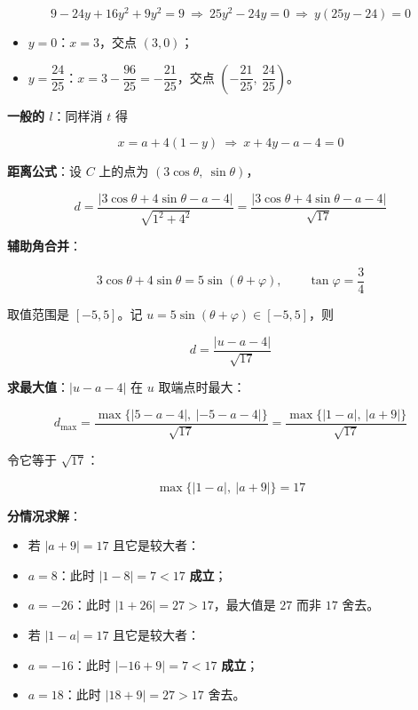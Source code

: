 \[9-24y+16y^{2}+9y^{2}=9\ \Longrightarrow\ 25y^{2}-24y=0\ \Longrightarrow\ y(25y-24)=0\]

\begin{itemize}
\item $y=0$：$x=3$，交点 $(3,0)$；
\item $y=\dfrac{24}{25}$：$x=3-\dfrac{96}{25}=-\dfrac{21}{25}$，交点 $\left(-\dfrac{21}{25},\ \dfrac{24}{25}\right)$。
\end{itemize}



\textbf{一般的 $l$}：同样消 $t$ 得

\[x=a+4(1-y)\ \Longrightarrow\ x+4y-a-4=0\]

\textbf{距离公式}：设 $C$ 上的点为 $(3\cos\theta,\ \sin\theta)$，

\[d=\frac{|3\cos\theta+4\sin\theta-a-4|}{\sqrt{1^{2}+4^{2}}}=\frac{|3\cos\theta+4\sin\theta-a-4|}{\sqrt{17}}\]

\textbf{辅助角合并}：

\[3\cos\theta+4\sin\theta=5\sin(\theta+\varphi),\qquad \tan\varphi=\frac34\]

取值范围是 $[-5,5]$。记 $u=5\sin(\theta+\varphi)\in[-5,5]$，则

\[d=\frac{|u-a-4|}{\sqrt{17}}\]

\textbf{求最大值}：$|u-a-4|$ 在 $u$ 取端点时最大：

\[d_{\max}=\frac{\max\{|5-a-4|,\ |-5-a-4|\}}{\sqrt{17}}=\frac{\max\{|1-a|,\ |a+9|\}}{\sqrt{17}}\]

令它等于 $\sqrt{17}$：

\[\max\{|1-a|,\ |a+9|\}=17\]

\textbf{分情况求解}：

\begin{itemize}
\item 若 $|a+9|=17$ 且它是较大者：
\item $a=8$：此时 $|1-8|=7<17$  \textbf{成立}；
\item $a=-26$：此时 $|1+26|=27>17$，最大值是 $27$ 而非 $17$  舍去。
\item 若 $|1-a|=17$ 且它是较大者：
\item $a=-16$：此时 $|-16+9|=7<17$  \textbf{成立}；
\item $a=18$：此时 $|18+9|=27>17$  舍去。
\end{itemize}

